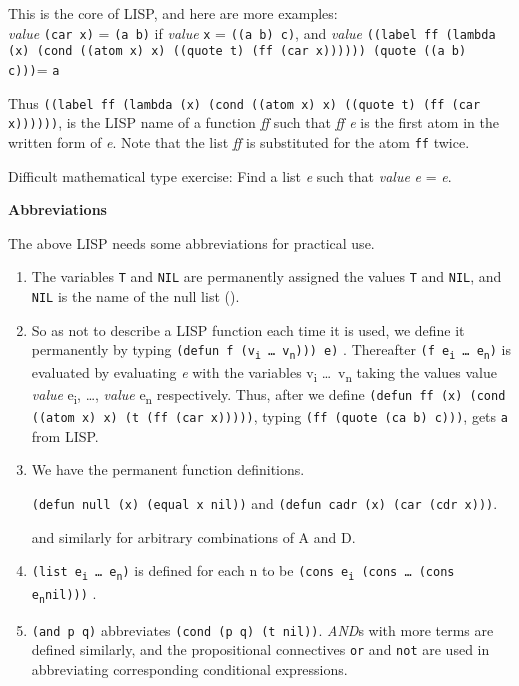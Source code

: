 \documentclass[8pt,letter,twocolumn]{article}
\newcommand{\args}[1] {#1\textsubscript{i} \dots \ #1\textsubscript{n}}
\newcommand{\ei}[0] {e\textsubscript{i}}
\newcommand{\en}[0] {e\textsubscript{n}}
\begin{document}
This is the core of LISP, and here are more examples:  \\

\textit{value} \texttt{(car x)} = \texttt{(a b)} if \textit{value} \texttt{x} =
\texttt{((a b) c)}, and \textit{value} \texttt{((label ff (lambda (x) (cond
  ((atom x) x) ((quote t) (ff (car x)))))) (quote ((a b) c)))}= \texttt{a}

Thus \texttt{((label ff (lambda (x) (cond ((atom x) x) ((quote t) (ff (car
  x))))))}, is the LISP name of a function \textit{ff} such that \textit{ff e}
is the first atom in the written form of \textit{e}. Note that the list
\textit{ff} is substituted for the atom \texttt{ff} twice.

Difficult mathematical type exercise: Find a list \textit{e} such that
\textit{value} \textit{e} = \textit{e}.

\vspace*{1\baselineskip}
\textbf{Abbreviations}
\vspace*{1\baselineskip}

The above LISP needs some abbreviations for practical use.

\begin{enumerate}
\setlength\itemsep{0em}

\item The variables \texttt{T} and \texttt{NIL} are permanently assigned the
  values \texttt{T} and \texttt{NIL}, and \texttt{NIL} is the name of the null
  list ().

\item So as not to describe a LISP function each time it is used, we define it
  permanently by typing \texttt{(defun f (\args{v}))) e)} . Thereafter
  \texttt{(f \args{e})} is evaluated by evaluating \textit{e} with the variables
  \args{v} taking the values value \textit{value} \ei, \dots, \textit{value} \en
  respectively. Thus, after we define \texttt{(defun ff (x) (cond ((atom x) x)
    (t (ff (car x)))))}, typing \texttt{(ff (quote (ca b) c)))}, gets \texttt{a}
  from LISP.

\item We have the permanent function definitions.

  \texttt{(defun null (x) (equal x nil))} and \texttt{(defun cadr (x) (car (cdr
    x)))}.

  and similarly for arbitrary combinations of A and D.

\item \texttt{(list \args{e})} is defined for each n to be \texttt{(cons \ei
    (cons \dots \ (cons \en nil)))} .

\item \texttt{(and p q)} abbreviates \texttt{(cond (p q) (t nil))}.
  \textit{AND}s with more terms are defined similarly, and the propositional
  connectives \texttt{or} and \texttt{not} are used in abbreviating
  corresponding conditional expressions.

\end{enumerate}
\end{document}
